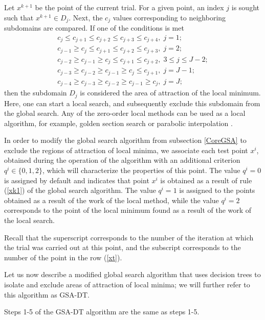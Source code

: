 \documentclass[entropy,article,submit,moreauthors,pdftex]{Definitions/mdpi}
\begin{document}
Let $x^{k+1}$ be the point of the current trial. For a given point, an index  $j$ is sought such that $x^{k+1} \in D_j$. 
Next, the  $c_j$ values corresponding to neighboring subdomains are compared. If one of the conditions is met
\begin{gather}\label{LocalPointC}
c_{j} \leq c_{j+1} \leq c_{j+2} \leq c_{j+3} \leq c_{j+4}, \; j=1; \nonumber \\ 
c_{j-1} \geq c_{j} \leq c_{j+1} \leq c_{j+2} \leq c_{j+3}, \; j=2;  \nonumber \\  
c_{j-2} \geq c_{j-1} \geq c_{j} \leq c_{j+1} \leq c_{j+2}, \; 3 \leq j \leq J-2; \\ 
c_{j-3} \geq c_{j-2} \geq c_{j-1} \geq c_{j} \leq c_{j+1}, \; j=J-1; \nonumber \\ 
c_{j-4} \geq c_{j-3} \geq c_{j-2} \geq c_{j-1} \geq c_{j}, \; j=J; \nonumber 
\end{gather}
then the subdomain $D_j$ is considered the area of attraction of the local minimum. Here, one can start a local search, and subsequently exclude this subdomain from the global search. 
Any of the zero-order local methods can be used as a local algorithm, for example, golden section search or parabolic interpolation \cite{Press}.

In order to modify the global search algorithm from subsection  \ref{CoreGSA} to exclude the regions of attraction of local minima, we associate each test point  $x^i$, obtained during the operation of the algorithm with an additional criterion $q^i \in \{0,1,2\}$, which will characterize the properties of this point. 
The value  $q^i=0$ is assigned by default and indicates that point $x^i$ is obtained as a result of rule (\ref{xk1}) of the global search algorithm.
The value $q^i=1$ is assigned to the points obtained as a result of the work of the local method, while the value  $q^i=2$ corresponds to the point of the local minimum found as a result of the work of the local search.

Recall that the superscript corresponds to the number of the iteration at which the trial was carried out at this point, and the subscript corresponds to the number of the point in the row  (\ref{xt}).

Let us now describe a modified global search algorithm that uses decision trees to isolate and exclude areas of attraction of local minima; we will further refer to this algorithm as GSA-DT.

Steps 1-5 of the GSA-DT algorithm are the same as steps 1-5.
\end{document}

